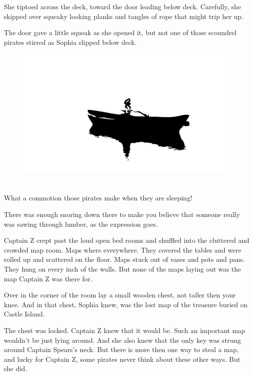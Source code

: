 \documentclass[12pt]{extbook}
\begin{document}
  She tiptoed across the deck, toward the door leading below deck.
  Carefully, she skipped over squeaky looking planks and tangles of rope
  that might trip her up.
  
  The door gave a little squeak as she opened it, but not one of those
  scoundrel pirates stirred as Sophia slipped below deck.
  
  \begin{figure}[htbp]
  \centering
  \includegraphics{img/rowing.png}
  \end{figure}
  
  \section{}\label{section-3}
  
  What a commotion those pirates make when they are sleeping!
  
  There was enough snoring down there to make you believe that someone
  really was sawing through lumber, as the expression goes.
  
  Captain Z crept past the loud open bed rooms and shuffled into the
  cluttered and crowded map room. Maps where everywhere. They covered the
  tables and were rolled up and scattered on the floor. Maps stuck out of
  vases and pots and pans. They hung on every inch of the walls. But none
  of the maps laying out was the map Captain Z was there for.
  
  Over in the corner of the room lay a small wooden chest, not taller then
  your knee. And in that chest, Sophia knew, was the lost map of the
  treasure buried on Castle Island.
  
  The chest was locked. Captain Z knew that it would be. Such an important
  map wouldn't be just lying around. And she also knew that the only key
  was strung around Captain Spears's neck. But there is more then one way
  to steal a map, and lucky for Captain Z, some pirates never think about
  these other ways. But she did.
  
\end{document}
